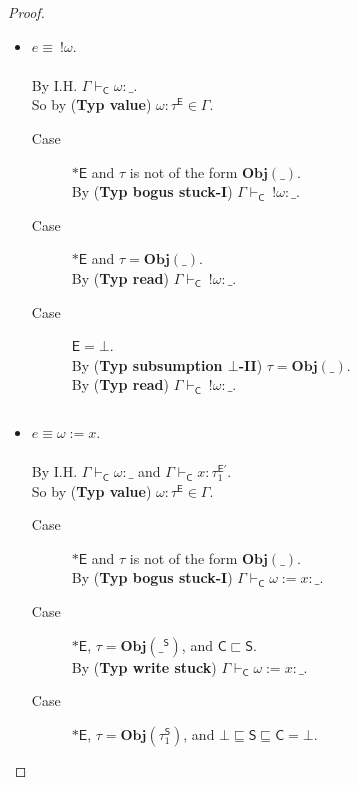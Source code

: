 \documentclass{sigplanconf}
\newcommand{\labo}{\mathsf O}
\newcommand{\labb}{\mathsf S}
\newcommand{\labt}{\mathsf E}
\newcommand{\labc}{\mathsf C}
\newcommand{\trule}[1]{(\textbf{Typ #1})}
\begin{document}
\begin{proof}
\begin{itemize}
\begin{description}
\item[Case] $\labt = \bot$.\\
By \trule{subsumption $\bot$-II} \\
$~~~$ $\tau = \mathbf{Obj}(\_^{\labb})$ such that $\labb \sqsubseteq \labo$.\\
By \trule{value} and \trule{un/protect} \\
$~~~$ $\Gamma \vdash_{\labc} \langle\labo\rangle~\omega : \_$.
\end{description}
$ $
\item $e \equiv ~!\omega$.\\
\\
By I.H. $\Gamma \vdash_{\labc} \omega : \_$.\\
So by \trule{value} $\omega : \tau^{\labt} \in \Gamma$.
\begin{description}
\item[Case] $\ast \labt$ and $\tau$ is not of the form $\mathbf{Obj}(\_)$.\\
By \trule{bogus stuck-I} $\Gamma \vdash_{\labc} ~!\omega : \_$.
\item[Case] $\ast \labt$ and $\tau = \mathbf{Obj}(\_)$.\\
By \trule{read} $\Gamma \vdash_{\labc} ~!\omega : \_$.
\item[Case] $\labt = \bot$.\\
By \trule{subsumption $\bot$-II} $\tau = \mathbf{Obj}(\_)$.\\
By \trule{read} $\Gamma \vdash_{\labc} ~!\omega : \_$.
\end{description}
$ $
\item $e \equiv \omega := x$.\\
\\
By I.H. $\Gamma \vdash_{\labc} \omega : \_$ and $\Gamma \vdash_{\labc} x : \tau_1^{\labt'}$.\\
So by \trule{value} $\omega : \tau^{\labt} \in \Gamma$.
\begin{description}
\item[Case] $\ast \labt$ and $\tau$ is not of the form $\mathbf{Obj}(\_)$.\\
By \trule{bogus stuck-I} $\Gamma \vdash_{\labc} \omega := x : \_$.
\item[Case] $\ast \labt$, $\tau = \mathbf{Obj}(\_^{\labb})$, and $\labc \sqsubset \labb$.\\
By \trule{write stuck} $\Gamma \vdash_{\labc} \omega := x : \_$.
\item[Case] $\ast \labt$, $\tau = \mathbf{Obj}(\tau_1^{\labb})$, and $\bot \sqsubseteq \labb \sqsubseteq \labc = \bot$.\\

\end{description}
\end{itemize}
\end{proof}
\end{document}
